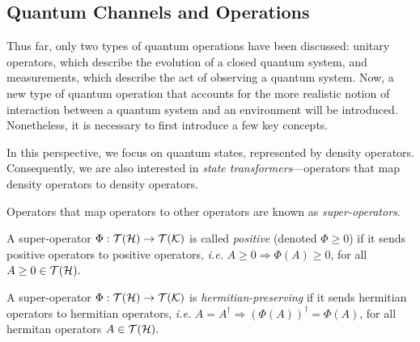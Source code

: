 


\subsection{Quantum Channels and Operations} \label{subsec:quantum_channels}


Thus far, only two types of quantum operations have been discussed: unitary operators, which describe the evolution of a closed quantum system, and measurements, which describe the act of observing a quantum system. Now, a new type of quantum operation that accounts for the more realistic notion of interaction between a quantum system and an environment will be introduced. Nonetheless, it is necessary to first introduce a few key concepts. 


\vspace{5pt}

In this perspective, we focus on quantum states, represented by density operators. Consequently, we are also interested in \emph{state transformers}---operators that map density operators to density operators.

\begin{definition}
 Operators that map operators to other operators are known as \emph{super-operators}. 
\end{definition}


\begin{definition} \label{def:positive_superoperator}
  A super-operator $\Phi: \mathcal{T}(\mathcal{H}) \to \mathcal{T}(\mathcal{K}) $ is called \emph{positive} (denoted $\Phi \geq 0$) if it sends positive operators to positive operators, \textit{i.e.} $A \geq 0 \Rightarrow{} \Phi (A) \geq 0$, for all $A \geq 0  \in \mathcal{T}(\mathcal{H}).$ 
\end{definition}



\begin{definition}
  A super-operator $ \Phi : \mathcal{T}(\mathcal{H}) \to \mathcal{T}(\mathcal{K})$ is \emph{hermitian-preserving} if it sends hermitian operators to hermitian operators, \textit{i.e.} $A = A^\dag \Rightarrow{} (\Phi(A))^\dag = \Phi(A)$, for all hermitan operators $A  \in \mathcal{T}(\mathcal{H}).$
\end{definition}


